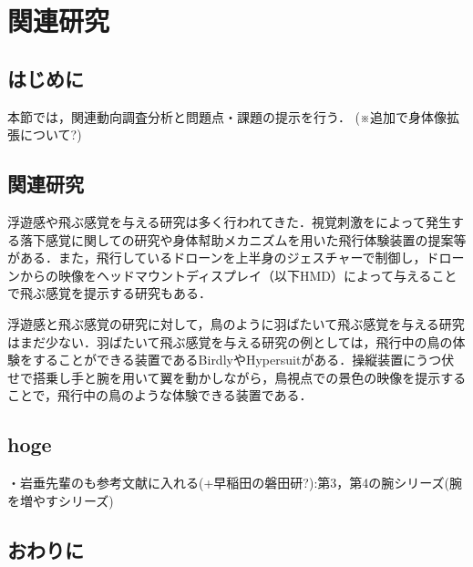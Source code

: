 \chapter[関連研究]%
        {関連研究}

\section{はじめに}
        本節では，関連動向調査分析と問題点・課題の提示を行う．
        (※追加で身体像拡張について?)

\section{関連研究}
        浮遊感や飛ぶ感覚を与える研究は多く行われてきた．視覚刺激をによって発生する落下感覚に関しての研究\cite{奥川夏輝2017VR空間における視覚刺激によって発生する落下感覚の分析}や身体幇助メカニズムを用いた飛行体験装置の提案\cite{鈴木拓馬2014hmd}等がある．また，飛行しているドローンを上半身のジェスチャーで制御し，ドローンからの映像をヘッドマウントディスプレイ（以下HMD）によって与えることで飛ぶ感覚を提示する研究\cite{rognon2018flyjacket}もある．

        浮遊感と飛ぶ感覚の研究に対して，鳥のように羽ばたいて飛ぶ感覚を与える研究はまだ少ない．羽ばたいて飛ぶ感覚を与える研究の例としては，飛行中の鳥の体験をすることができる装置であるBirdly\cite{rheiner2014birdly}やHypersuit\cite{hypersuit}がある．操縦装置にうつ伏せで搭乗し手と腕を用いて翼を動かしながら，鳥視点での景色の映像を提示することで，飛行中の鳥のような体験できる装置である．


\section{hoge}        
        ・岩垂先輩のも参考文献に入れる(+早稲田の磐田研?):第3，第4の腕シリーズ(腕を増やすシリーズ) 

\section{おわりに}
